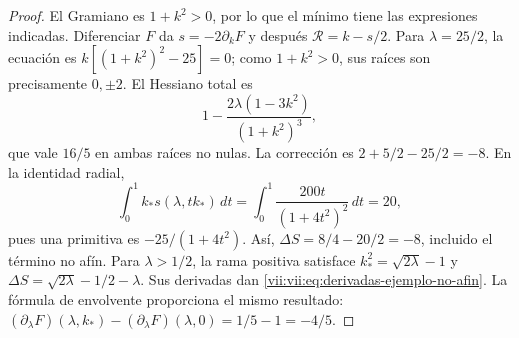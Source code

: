 \begin{proof}
El Gramiano es \(1+k^2>0\), por lo que el mínimo tiene las
expresiones indicadas. Diferenciar \(F\) da
\(s=-2\partial_kF\) y después \(\mathcal R=k-s/2\).
Para \(\lambda=25/2\), la ecuación es
\(k[(1+k^2)^2-25]=0\); como \(1+k^2>0\), sus raíces
son precisamente \(0,\pm2\). El Hessiano total es
\[
 1-\frac{2\lambda(1-3k^2)}{(1+k^2)^3},
\]
que vale \(16/5\) en ambas raíces no nulas. La corrección es
\(2+5/2-25/2=-8\). En la identidad radial,
\[
 \int_0^1 k_*s(\lambda,tk_*)\,dt
    =\int_0^1\frac{200t}{(1+4t^2)^2}\,dt=20,
\]
pues una primitiva es \(-25/(1+4t^2)\).
Así, \(\Delta S=8/4-20/2=-8\), incluido el término no afín.
Para \(\lambda>1/2\), la rama positiva satisface
\(k_*^2=\sqrt{2\lambda}-1\) y
\(\Delta S=\sqrt{2\lambda}-1/2-\lambda\).
Sus derivadas dan \eqref{vii:vii:eq:derivadas-ejemplo-no-afin}.
La fórmula de envolvente proporciona el mismo resultado:
\((\partial_\lambda F)(\lambda,k_*)
 -(\partial_\lambda F)(\lambda,0)=1/5-1=-4/5\).
\end{proof}
